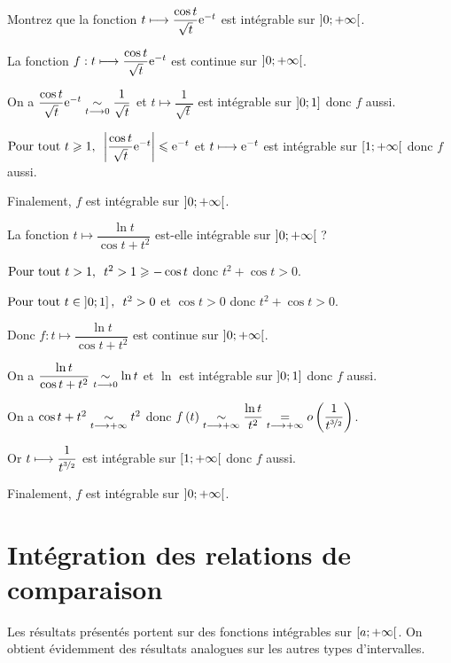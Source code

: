 \begin{exo}
Montrez que la fonction \(t\mapsto\dfrac{\cos t}{\sqrt{t}}\e{-t}\) est intégrable sur \(\intervee{0}{\pinf}\).
\end{exo}

\begin{corr}
La fonction \(f:t\mapsto\dfrac{\cos t}{\sqrt{t}}\e{-t}\) est continue sur \(\intervee{0}{\pinf}\).

On a \(\dfrac{\cos t}{\sqrt{t}}\e{-t}\simqd{t\to0}\dfrac{1}{\sqrt{t}}\) et \(t\mapsto\dfrac{1}{\sqrt{t}}\) est intégrable sur \(\intervei{0}{1}\) donc \(f\) aussi.

\(\quantifs{\Tpt t\geq1}\abs{\dfrac{\cos t}{\sqrt{t}}\e{-t}}\leq\e{-t}\) et \(t\mapsto\e{-t}\) est intégrable sur \(\intervie{1}{\pinf}\) donc \(f\) aussi.

Finalement, \(f\) est intégrable sur \(\intervee{0}{\pinf}\).
\end{corr}

\begin{exo}
La fonction \(t\mapsto\dfrac{\ln t}{\cos t+t^2}\) est-elle intégrable sur \(\intervee{0}{\pinf}\) ?
\end{exo}

\begin{corr}
\(\quantifs{\Tpt t>1}t^2>1\geq-\cos t\) donc \(t^2+\cos t>0\).

\(\quantifs{\Tpt t\in\intervei{0}{1}}t^2>0\) et \(\cos t>0\) donc \(t^2+\cos t>0\).

Donc \(f:t\mapsto\dfrac{\ln t}{\cos t+t^2}\) est continue sur \(\intervee{0}{\pinf}\).

On a \(\dfrac{\ln t}{\cos t+t^2}\simqd{t\to0}\ln t\) et \(\ln\) est intégrable sur \(\intervei{0}{1}\) donc \(f\) aussi.

On a \(\cos t+t^2\simqd{t\to\pinf}t^2\) donc \(f\paren{t}\simqd{t\to\pinf}\dfrac{\ln t}{t^2}\egqd{t\to\pinf}\o{\dfrac{1}{t^{\nicefrac{3}{2}}}}\).

Or \(t\mapsto\dfrac{1}{t^{\nicefrac{3}{2}}}\) est intégrable sur \(\intervie{1}{\pinf}\) donc \(f\) aussi.

Finalement, \(f\) est intégrable sur \(\intervee{0}{\pinf}\).
\end{corr}

\section{Intégration des relations de comparaison}

Les résultats présentés portent sur des fonctions intégrables sur \(\intervie{a}{\pinf}\). On obtient évidemment des résultats analogues sur les autres types d'intervalles.

